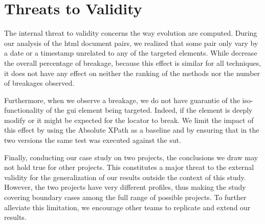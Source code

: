 \section{Threats to Validity}

The internal threat to validity concerns the way evolution are computed. During our analysis of the \gls{html} document pairs, we realized that some pair only vary by a date or a timestamp unrelated to any of the targeted elements. While decrease the overall percentage of breakage, because this effect is similar for all techniques, it does not have any effect on neither the ranking of the methods nor the number of breakages observed.

Furthermore, when we observe a breakage, we do not have guarantie of the iso-functionality of the \gls{gui} element being targeted. Indeed, if the element is deeply modify or it might be expected for the locator to break. We limit the impact of this effect by using the Absolute XPath as a baseline and by ensuring that in the two versions the same test was executed against the \gls{sut}.

Finally, conducting our case study on two projects, the conclusions we draw may not hold true for other projects. This constitutes a major threat to the external validity for the generalization of our results outside the context of this study. However, the two projects have very different profiles, thus making the study covering boundary cases among the full range of possible projects. To further alleviate this limitation, we encourage other teams to replicate and extend our results.

